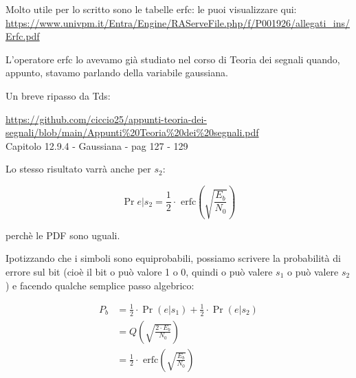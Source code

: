 \begin{tcolorbox}

    Molto utile per lo scritto sono le tabelle erfc: le puoi visualizzare qui: \\
    \url{https://www.univpm.it/Entra/Engine/RAServeFile.php/f/P001926/allegati_ins/Erfc.pdf} \newline

    L'operatore erfc lo avevamo già studiato nel corso di Teoria dei segnali quando, appunto, stavamo 
    parlando della variabile gaussiana. \newline

    Un breve ripasso da Tds: \newline 

    \url{https://github.com/ciccio25/appunti-teoria-dei-segnali/blob/main/Appunti%20Teoria%20dei%20segnali.pdf} \\
    Capitolo 12.9.4 - Gaussiana - pag 127 - 129 

\end{tcolorbox}

Lo stesso risultato varrà anche per $s_2$: 

{
    \Large 
    \begin{equation}
        \Pr {e | s_2}
        = 
        \frac{1}{2}
        \cdot
        \text{ erfc}
        \left(
            \sqrt{\frac{E_b}{N_0}}
        \right)
    \end{equation}
}

perchè le PDF sono uguali. \newline 

Ipotizzando che i simboli sono equiprobabili, possiamo scrivere la probabilità di errore sul bit 
(cioè il bit o può valore 1 o 0, quindi o può valere $s_1$ o può valere $s_2$) e facendo qualche semplice passo algebrico: 

{
    \Large 
    \begin{equation}
        \begin{split}
            P_b
            &= 
            \frac{1}{2}
            \cdot
            \Pr(e | s_1)
            +
            \frac{1}{2}
            \cdot
            \Pr(e | s_2)
            \\
            &= 
            Q \left( \sqrt{\frac{2 \cdot E_b}{N_0}}\right)
            \\
            &=
            \frac{1}{2}
        \cdot
        \text{ erfc}
        \left(
            \sqrt{\frac{E_b}{N_0}}
        \right)
        \end{split}
    \end{equation}
}

